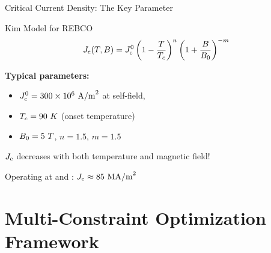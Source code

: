 \begin{frame}{Critical Current Density: The Key Parameter}
    \begin{block}{Kim Model for REBCO}
        \begin{equation}
            J_\text{c}(T,B) = J_\text{c}^0 \left(1-\frac{T}{T_c}\right)^{n} \left(1+\frac{B}{B_0}\right)^{-m}
        \end{equation}
        
        \textbf{Typical parameters:}
        \begin{itemize}
            \item $J_\text{c}^0 = 300 \times 10^6~\text{A/m}^2$ at self-field, 
            \item $T_c = 90~K$ (onset temperature)
            \item $B_0 = 5~T$, $n = 1.5$, $m = 1.5$
        \end{itemize}
    \end{block}
    
    \vspace{0.3cm}
     $J_\text{c}$ decreases with both temperature and magnetic field!
    
    \begin{center}
        Operating at  and : $J_\text{c} \approx 85~\text{MA/m}^2$
    \end{center}
\end{frame}

\section{Multi-Constraint Optimization Framework}


